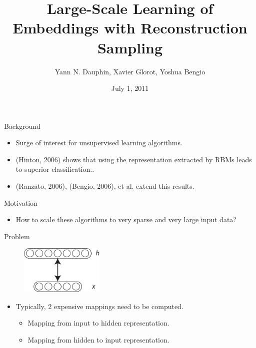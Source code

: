 \documentclass{beamer}
\title[Large-Scale Learning of Embeddings]{Large-Scale Learning of Embeddings with Reconstruction Sampling}
\author{Yann N. Dauphin, Xavier Glorot, Yoshua Bengio}
\institute{Université de Montréal}
\date{July 1, 2011}
\begin{document}

\begin{frame}
\titlepage
\end{frame}

\begin{frame}{Background}
\begin{itemize}
\item Surge of interest for unsupervised learning algorithms.
\item (Hinton, 2006) shows that using the representation extracted by RBMs
leads to superior classification..
\item (Ranzato, 2006), (Bengio, 2006), et al. extend this results.
\end{itemize}
\end{frame}

\begin{frame}{Motivation}
\begin{itemize}
\item How to scale these algorithms to very sparse and very large input data?
\end{itemize}
\end{frame}

\begin{frame}{Problem}

\begin{center}
	\begin{figure}[htbp]
		\includegraphics[width=4cm]{images/RBM.pdf}
	\end{figure}
\end{center}

\begin{itemize}
\item Typically, 2 expensive mappings need to be computed.
    \begin{itemize}
        \item Mapping from input to hidden representation.
        \item Mapping from hidden to input representation.
    \end{itemize}
\end{itemize}
\end{frame}
\end{document}
